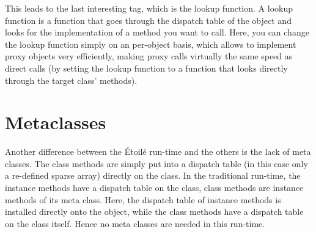 This leads to the last interesting tag, which is the lookup function. A lookup function is a function that goes through the dispatch table of the object and looks for the implementation of a method you want to call. Here, you can change the lookup function simply on an per-object basis, which allows to implement proxy objects very efficiently, making proxy calls virtually the same speed as direct calls (by setting the lookup function to a function that looks directly through the target class' methods).

\section{Metaclasses}

Another difference between the \'Etoil\'e run-time and the others is the lack of meta classes. The class methods are simply put into a dispatch table (in this case only a re-defined sparse array) directly on the class. In the traditional run-time, the instance methods have a dispatch table on the class, class methods are instance methods of its meta class. Here, the dispatch table of instance methods is installed directly onto the object, while the class methods have a dispatch table on the class itself. Hence no meta classes are needed in this run-time.


